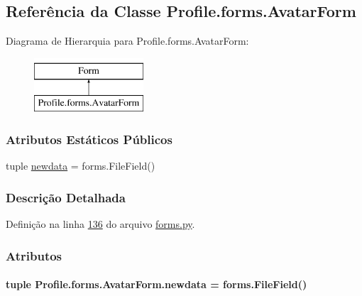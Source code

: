 \hypertarget{classProfile_1_1forms_1_1AvatarForm}{}\subsection{Referência da Classe Profile.\+forms.\+Avatar\+Form}
\label{classProfile_1_1forms_1_1AvatarForm}
Diagrama de Hierarquia para Profile.\+forms.\+Avatar\+Form\+:\begin{figure}[H]
\begin{center}
\leavevmode
\includegraphics[height=2.000000cm]{da/da4/classProfile_1_1forms_1_1AvatarForm}
\end{center}
\end{figure}
\subsubsection*{Atributos Estáticos Públicos}
\begin{DoxyCompactItemize}
\item 
tuple \hyperlink{classProfile_1_1forms_1_1AvatarForm_af61dac7a51640ffe7d4e51aef53631ce}{newdata} = forms.\+File\+Field()
\end{DoxyCompactItemize}


\subsubsection{Descrição Detalhada}


Definição na linha \hyperlink{Profile_2forms_8py_source_l00136}{136} do arquivo \hyperlink{Profile_2forms_8py_source}{forms.\+py}.



\subsubsection{Atributos}
\hypertarget{classProfile_1_1forms_1_1AvatarForm_af61dac7a51640ffe7d4e51aef53631ce}{}
\paragraph[{newdata}]{\setlength{\rightskip}{0pt plus 5cm}tuple Profile.\+forms.\+Avatar\+Form.\+newdata = forms.\+File\+Field()\hspace{0.3cm}{\ttfamily [static]}}\label{classProfile_1_1forms_1_1AvatarForm_af61dac7a51640ffe7d4e51aef53631ce}


